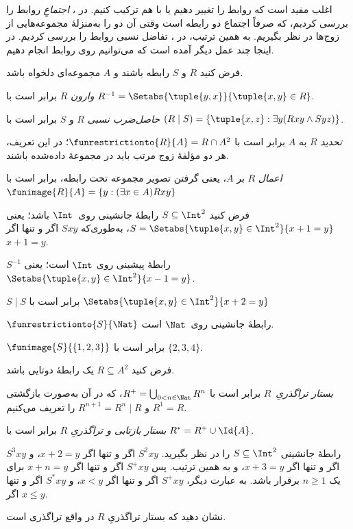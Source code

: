 \documentclass[../../../include/open-logic-section]{subfiles}
\begin{document}

اغلب مفید است که روابط را تغییر دهیم یا با هم ترکیب کنیم. در
، \emph{اجتماعِ}
روابط را بررسی کردیم، که صرفاً اجتماع دو رابطه است وقتی آن دو را
به‌منزلهٔ مجموعه‌هایی از زوج‌ها در نظر بگیریم. به همین ترتیب، در
، تفاضل نسبی روابط را
بررسی کردیم. در اینجا چند عمل دیگر آمده است که می‌توانیم روی روابط انجام دهیم.

\begin{defn}
فرض کنید $R$ و $S$ رابطه باشند و $A$ مجموعه‌ای دلخواه باشد.

\emph{وارون} $R$ برابر است با $R^{-1} = \Setabs{\tuple{y, x}}{\tuple{x,
    y} \in R}$.

\emph{حاصل‌ضرب نسبی} $R$ و $S$ برابر است با $(R \mid S) =
\{\tuple{x, z} : \exists y(Rxy \land Syz)\}$.

\emph{تحدید} $R$ به $A$ برابر است با $\funrestrictionto{R}{A}= R
\cap A^2$؛ در این تعریف، هر دو مؤلفهٔ زوج مرتب باید در مجموعهٔ داده‌شده باشند.

\emph{اعمال} $R$ بر $A$، یعنی گرفتن تصویر مجموعه تحت رابطه، برابر است با $\funimage{R}{A} = \{y :
(\exists x \in A)Rxy\}$
\end{defn}

\begin{ex}
فرض کنید $S \subseteq \Int^2$ رابطهٔ جانشینی روی~$\Int$ باشد؛ یعنی
$S = \Setabs{\tuple{x, y} \in \Int^2}{x + 1 = y}$، به‌طوری‌که $Sxy$ اگر و تنها اگر $x + 1 = y$.

$S^{-1}$ رابطهٔ پیشینی روی $\Int$ است؛ یعنی
$\Setabs{\tuple{x,y}\in\Int^2}{x -1 =y}$.

$S\mid S$ برابر است با
$ \Setabs{\tuple{x,y}\in\Int^2}{x + 2 =y}$

$\funrestrictionto{S}{\Nat}$ رابطهٔ جانشینی روی~$\Nat$ است.

$\funimage{S}{\{1,2,3\}}$ برابر است با $\{2, 3, 4\}$.
\end{ex}

\begin{defn}فرض کنید $R \subseteq A^2$ یک رابطهٔ دوتایی باشد.

\emph{بستار تراگذریِ}~$R$ برابر است با $R^+ = \bigcup_{0 < n \in
\Nat} R^n$، که در آن به‌صورت بازگشتی $R^1 = R$ و $R^{n+1} = R^n
\mid R$ را تعریف می‌کنیم.

\emph{بستار بازتابی و تراگذریِ} $R$ برابر است با $R^* = R^+ \cup
\Id{A}$.
\end{defn}

\begin{ex}
رابطهٔ جانشینی $S \subseteq \Int^2$ را در نظر بگیرید. $S^2xy$ اگر و تنها اگر $x + 2 =
y$، و $S^3xy$ اگر و تنها اگر $x + 3 = y$، و به همین ترتیب. پس $S^+xy$ اگر و تنها اگر $x + n = y$ برای یک
$n \geq 1$ برقرار باشد. به عبارت دیگر، $S^+xy$ اگر و تنها اگر $x < y$، و $S^*xy$ اگر و تنها اگر $x \le
y$.
\end{ex}

\begin{prob}
نشان دهید که بستار تراگذریِ $R$ در واقع تراگذری است.
\end{prob}
\end{document}
